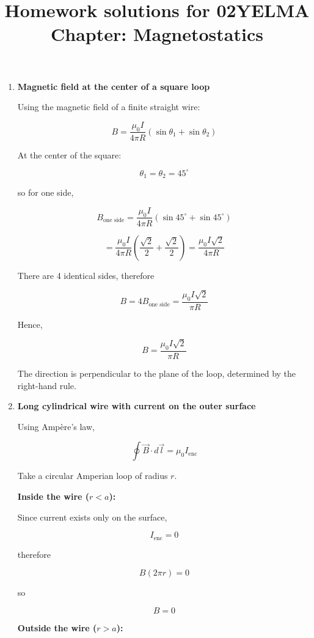 \documentclass[12pt]{article}
\title{Homework solutions for 02YELMA \\ Chapter: Magnetostatics}
\begin{document}
\date{}
\maketitle
\vspace{-0.8in}

\begin{enumerate}

\item \textbf{Magnetic field at the center of a square loop}

Using the magnetic field of a finite straight wire:

\[
B=\frac{\mu_0 I}{4\pi R}\left(\sin\theta_1+\sin\theta_2\right)
\]

At the center of the square:

\[
\theta_1=\theta_2=45^\circ
\]

so for one side,

\[
B_{\text{one side}}
=
\frac{\mu_0 I}{4\pi R}
\left(
\sin45^\circ+\sin45^\circ
\right)
\]

\[
=
\frac{\mu_0 I}{4\pi R}
\left(
\frac{\sqrt2}{2}+\frac{\sqrt2}{2}
\right)
=
\frac{\mu_0 I\sqrt2}{4\pi R}
\]

There are 4 identical sides, therefore

\[
B=
4B_{\text{one side}}
=
\frac{\mu_0 I\sqrt2}{\pi R}
\]

Hence,

\[
\boxed{
B=\frac{\mu_0 I\sqrt2}{\pi R}
}
\]

The direction is perpendicular to the plane of the loop, determined by the right-hand rule.

\vspace{0.5cm}

\item \textbf{Long cylindrical wire with current on the outer surface}

Using Ampère’s law,

\[
\oint \vec B\cdot d\vec l=\mu_0 I_{\text{enc}}
\]

Take a circular Amperian loop of radius \(r\).

\textbf{Inside the wire (\(r<a\)):}

Since current exists only on the surface,

\[
I_{\text{enc}}=0
\]

therefore

\[
B(2\pi r)=0
\]

so

\[
\boxed{B=0}
\]

\textbf{Outside the wire (\(r>a\)):}


\end{enumerate}
\end{document}
